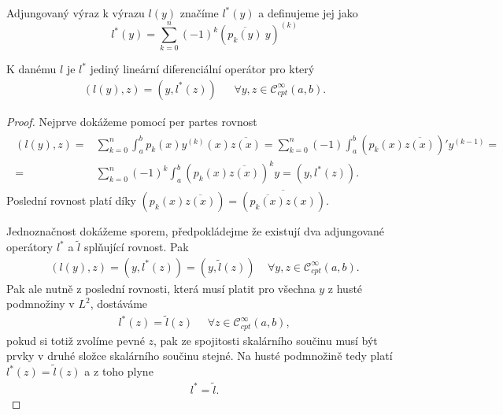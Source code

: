 \begin{definition}
Adjungovaný výraz k výrazu $l(y)$ značíme $l^*(y)$ a definujeme jej jako
\begin{equation}
    l^*(y) = \sum_{k=0}^{n} (-1)^{k} \left(\overline{p_k(y)} ~ y\right)^{(k)}
\end{equation}
\end{definition}

\begin{lemma}
K danému $l$ je $l^*$ jediný lineární diferenciální operátor pro který
\begin{align*}
    \left(l(y), z\right) = \left(y, l^*(z)\right)~ ~ ~ ~ ~ ~ ~ \forall y, z \in \mathcal{C}^{\infty}_{cpt} (a,b).
\end{align*}
\end{lemma}

\begin{proof}
Nejprve dokážeme pomocí per partes rovnost
\begin{align*}
\begin{split}
    \left(l(y), z\right) =& \sum_{k=0}^{n} \int_a^b p_k(x) y^{(k)}(x) \overline{z(x)} =
    \sum_{k=0}^{n} (-1) \int_a^b \left(p_k(x) \overline{z(x)}\right)' y^{(k-1)} = \\
    =& \sum_{k=0}^{n} (-1)^{k} \int_a^b \left(p_k(x) \overline{z(x)}\right)^{k} y =
    \left(y, l^*(z)\right).
\end{split}
\end{align*}
Poslední rovnost platí díky $\left(p_k(x) \overline{z(x)}\right) = \overline{\left(\overline{p_k(x)} z(x)\right)}$.

Jednoznačnost dokážeme sporem, předpokládejme že existují dva adjungované operátory $l^*$ a $\tilde{l}$ splňující rovnost. Pak
\begin{align*}
    \left(l(y), z\right) = \left(y, l^*(z)\right) = \left(y, \tilde{l}(z)\right) ~ ~ ~ ~ ~ \forall y, z \in \mathcal{C}^{\infty}_{cpt} (a,b).
\end{align*}
Pak ale nutně z poslední rovnosti, která musí platit pro všechna $y$ z husté podmnožiny v $L^2$, dostáváme
\begin{align*}
    l^*(z) = \tilde{l}(z) ~ ~ ~ ~ ~ ~ \forall z \in \mathcal{C}^{\infty}_{cpt} (a,b),
\end{align*}
pokud si totiž zvolíme pevné $z$, pak ze spojitosti skalárního součinu musí být prvky v druhé složce skalárního součinu stejné. Na husté podmnožině tedy platí $l^*(z) = \tilde{l}(z)$ a z toho plyne
\begin{align*}
    l^* = \tilde{l}.
\end{align*}
\end{proof}

